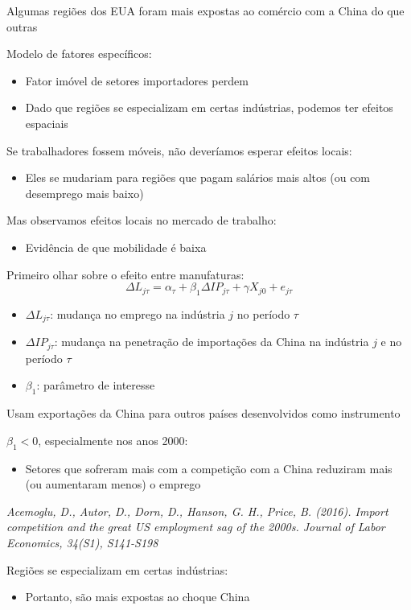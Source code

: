 \documentclass[a4paper,12pt]{article}[abntex2]
\begin{document}
Algumas regiões dos EUA foram mais expostas ao comércio com a China do que outras

Modelo de fatores específicos:
\begin{itemize}
  \item Fator imóvel de setores importadores perdem
  \item Dado que regiões se especializam em certas indústrias, podemos ter efeitos espaciais
\end{itemize}

Se trabalhadores fossem móveis, não deveríamos esperar efeitos locais:
\begin{itemize}
  \item Eles se mudariam para regiões que pagam salários mais altos (ou com desemprego mais baixo)
\end{itemize}

Mas observamos efeitos locais no mercado de trabalho:
\begin{itemize}
  \item Evidência de que mobilidade é baixa
\end{itemize}

Primeiro olhar sobre o efeito entre manufaturas:
\[
\Delta L_{j\tau} = \alpha_{\tau} + \beta_1 \Delta IP_{j\tau} + \gamma X_{j0} + e_{j\tau}
\]
\begin{itemize}
  \item $\Delta L_{j\tau}$: mudança no emprego na indústria $j$ no período $\tau$
  \item $\Delta IP_{j\tau}$: mudança na penetração de importações da China na indústria $j$ e no período $\tau$
  \item $\beta_1$: parâmetro de interesse
\end{itemize}

Usam exportações da China para outros países desenvolvidos como instrumento

$\beta_1 < 0$, especialmente nos anos 2000:
\begin{itemize}
  \item Setores que sofreram mais com a competição com a China reduziram mais (ou aumentaram menos) o emprego
\end{itemize}
\textit{Acemoglu, D., Autor, D., Dorn, D., Hanson, G. H., Price, B. (2016). Import competition and the great US employment sag of the 2000s. Journal of Labor Economics, 34(S1), S141-S198}

Regiões se especializam em certas indústrias:
\begin{itemize}
  \item Portanto, são mais expostas ao choque China
\end{itemize}
\end{document}

